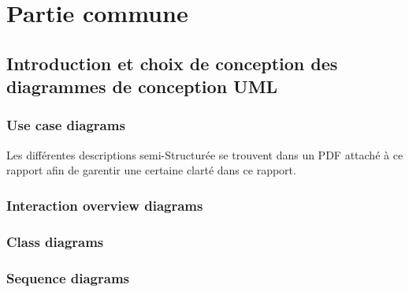 \documentclass[]{report}
\begin{document}




\newpage

\tableofcontents

\newpage

\chapter{Partie commune}


\newpage




\section{Introduction et choix de conception des diagrammes de conception UML}



\subsection{Use case diagrams}
Les différentes descriptions semi-Structurée se trouvent dans un PDF attaché à ce rapport afin de garentir une certaine clarté dans ce rapport.
\newpage

\subsection{Interaction overview diagrams}



\newpage

\subsection{Class diagrams}



\newpage

\subsection{Sequence diagrams}
\end{document}
